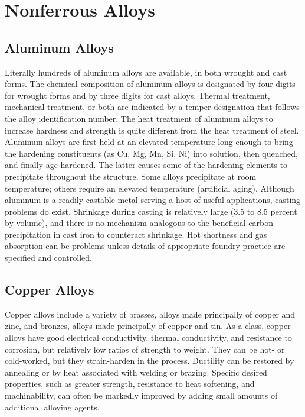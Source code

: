 \documentclass[a4paper,openany,12pt]{book}
\begin{document}
\section{Nonferrous Alloys}
\label{nonferrous-alloys}
\subsection{Aluminum Alloys}
\label{aluminum-alloys}
Literally hundreds of aluminum alloys are available, in both wrought and
cast forms. The chemical composition of aluminum alloys is designated by
four digits for wrought forms and by three digits for cast alloys.
Thermal treatment, mechanical treatment, or both are indicated by a
temper designation that follows the alloy identification number. The
heat treatment of aluminum alloys to increase hardness and strength is
quite different from the heat treatment of steel. Aluminum alloys are
first held at an elevated temperature long enough to bring the hardening
constituents (as Cu, Mg, Mn, Si, Ni) into solution, then quenched, and
finally age-hardened. The latter causes some of the hardening elements
to precipitate throughout the structure. Some alloys precipitate at room
temperature; others require an elevated temperature (artificial aging).
Although aluminum is a readily castable metal serving a host of useful
applications, casting problems do exist. Shrinkage during casting is
relatively large (3.5 to 8.5 percent by volume), and there is no
mechanism analogous to the beneficial carbon precipitation in cast iron
to counteract shrinkage. Hot shortness and gas absorption can be
problems unless details of appropriate foundry practice are specified
and controlled.

\subsection{Copper Alloys}
\label{copper-alloys}
Copper alloys include a variety of brasses, alloys made principally of
copper and zinc, and bronzes, alloys made principally of copper and tin.
As a class, copper alloys have good electrical conductivity, thermal
conductivity, and resistance to corrosion, but relatively low ratios of
strength to weight. They can be hot- or cold-worked, but they
strain-harden in the process. Ductility can be restored by annealing or
by heat associated with welding or brazing. Specific desired properties,
such as greater strength, resistance to heat softening, and
machinability, can often be markedly improved by adding small amounts of
additional alloying agents.
\end{document}
